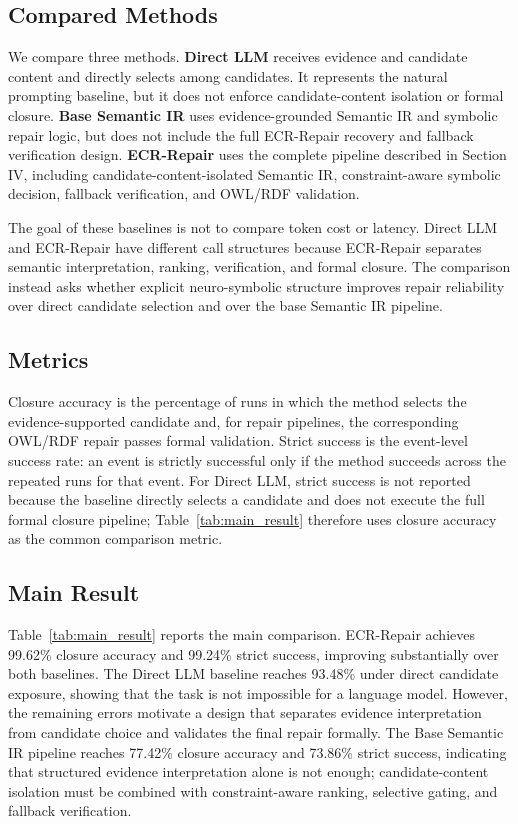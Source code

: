\documentclass[conference]{IEEEtran}
\begin{document}
\subsection{Compared Methods}

We compare three methods. \textbf{Direct LLM} receives evidence and candidate content and directly selects among candidates. It represents the natural prompting baseline, but it does not enforce candidate-content isolation or formal closure. \textbf{Base Semantic IR} uses evidence-grounded Semantic IR and symbolic repair logic, but does not include the full ECR-Repair recovery and fallback verification design. \textbf{ECR-Repair} uses the complete pipeline described in Section IV, including candidate-content-isolated Semantic IR, constraint-aware symbolic decision, fallback verification, and OWL/RDF validation.

The goal of these baselines is not to compare token cost or latency. Direct LLM and ECR-Repair have different call structures because ECR-Repair separates semantic interpretation, ranking, verification, and formal closure. The comparison instead asks whether explicit neuro-symbolic structure improves repair reliability over direct candidate selection and over the base Semantic IR pipeline.

\subsection{Metrics}

Closure accuracy is the percentage of runs in which the method selects the evidence-supported candidate and, for repair pipelines, the corresponding OWL/RDF repair passes formal validation. Strict success is the event-level success rate: an event is strictly successful only if the method succeeds across the repeated runs for that event. For Direct LLM, strict success is not reported because the baseline directly selects a candidate and does not execute the full formal closure pipeline; Table~\ref{tab:main_result} therefore uses closure accuracy as the common comparison metric.

\subsection{Main Result}

Table~\ref{tab:main_result} reports the main comparison. ECR-Repair achieves 99.62\% closure accuracy and 99.24\% strict success, improving substantially over both baselines. The Direct LLM baseline reaches 93.48\% under direct candidate exposure, showing that the task is not impossible for a language model. However, the remaining errors motivate a design that separates evidence interpretation from candidate choice and validates the final repair formally. The Base Semantic IR pipeline reaches 77.42\% closure accuracy and 73.86\% strict success, indicating that structured evidence interpretation alone is not enough; candidate-content isolation must be combined with constraint-aware ranking, selective gating, and fallback verification.
\end{document}
